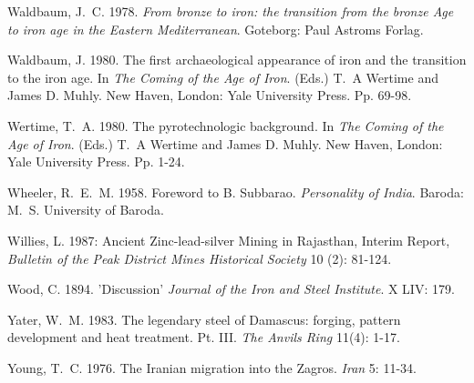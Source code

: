 \begin{thebibliography}{99}
 Waldbaum, J.~C. 1978. \textit{From bronze to iron: the transition from the bronze Age to iron age in the Eastern Mediterranean}. Goteborg: Paul Astroms Forlag.

 Waldbaum, J. 1980. The first archaeological appearance of iron and the transition to the iron age. In \textit{The Coming of the Age of Iron}. (Eds.) T.~A Wertime and James D. Muhly. New Haven, London: Yale University Press. Pp. 69­-98.

 Wertime, T.~A. 1980. The pyrotechnologic background. In \textit{The Coming of the Age of Iron}. (Eds.) T.~A Wertime and James D. Muhly. New Haven, London: Yale University Press. Pp. 1-24.

 Wheeler, R.~E.~M. 1958. Foreword to B. Subbarao. \textit{Personality of India}. Baroda: M.~S. University of Baroda.

 Willies, L. 1987: Ancient Zinc-lead-silver Mining in Rajasthan, Interim Report, \textit{Bulletin of the Peak District Mines Historical Society} 10 (2): 81-124.

 Wood, C. 1894. 'Discussion'  \textit{Journal of the Iron and Steel Institute}.  X LIV: 179.

 Yater, W.~M. 1983. The legendary steel of Damascus: forging, pattern development and heat treatment. Pt. III. \textit{The Anvils Ring} 11(4): 1-17.

 Young, T.~C. 1976. The Iranian migration into the Zagros. \textit{Iran} 5: 11-34. 

\end{thebibliography}


\label{endchapter8}
